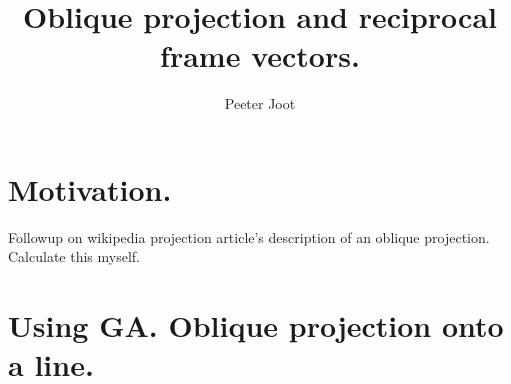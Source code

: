 \documentclass{article}      %
\title{ Oblique projection and reciprocal frame vectors. }
\author{Peeter Joot}         %
\begin{document}

\maketitle{}

\section{ Motivation. }

Followup on wikipedia projection article's description of an oblique
projection.  Calculate this myself.

\section{ Using GA.  Oblique projection onto a line. }
\end{document}
